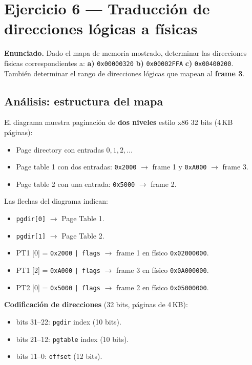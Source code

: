 \documentclass[11pt,a4paper]{article}
\begin{document}
\section{Ejercicio 6 --- Traducción de direcciones lógicas a físicas}

\textbf{Enunciado.} Dado el mapa de memoria mostrado, determinar las
direcciones físicas correspondientes a:
\textbf{a)} \texttt{0x00000320}
\textbf{b)} \texttt{0x00002FFA}
\textbf{c)} \texttt{0x00400200}.
También determinar el rango de direcciones lógicas que mapean al
\textbf{frame 3}.

\subsection*{Análisis: estructura del mapa}

El diagrama muestra paginación de \textbf{dos niveles} estilo x86 32
bits (4\,KB páginas):

\begin{itemize}[leftmargin=*,nosep]
    \item Page directory con entradas $0, 1, 2, \ldots$
    \item Page table 1 con dos entradas: \texttt{0x2000} $\to$
        frame 1 y \texttt{0xA000} $\to$ frame 3.
    \item Page table 2 con una entrada: \texttt{0x5000} $\to$
        frame 2.
\end{itemize}

Las flechas del diagrama indican:

\begin{itemize}[leftmargin=*,nosep]
    \item \texttt{pgdir[0]} $\to$ Page Table 1.
    \item \texttt{pgdir[1]} $\to$ Page Table 2.
    \item PT1 [0] = \texttt{0x2000} \texttt{| flags} $\to$ frame 1
        en físico \texttt{0x02000000}.
    \item PT1 [2] = \texttt{0xA000} \texttt{| flags} $\to$ frame 3
        en físico \texttt{0x0A000000}.
    \item PT2 [0] = \texttt{0x5000} \texttt{| flags} $\to$ frame 2
        en físico \texttt{0x05000000}.
\end{itemize}

\textbf{Codificación de direcciones} (32 bits, páginas de 4\,KB):

\begin{itemize}[leftmargin=*,nosep]
    \item bits 31--22: \texttt{pgdir} index (10 bits).
    \item bits 21--12: \texttt{pgtable} index (10 bits).
    \item bits 11--0: \texttt{offset} (12 bits).
\end{itemize}
\end{document}

